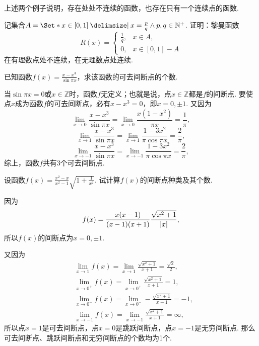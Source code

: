 上述两个例子说明，存在处处不连续的函数，也存在只有一个连续点的函数.

\begin{example}
记集合\(A = \Set*{ x\in[0,1] \given x = \frac{p}{q} \land p,q\in\mathbb{N}^+ }\).
证明：黎曼函数\[
R(x) = \left\{ \begin{array}{cl}
\frac{1}{q}, & x \in A, \\
0, & x \in [0,1] - A
\end{array} \right.
\]在有理数点处不连续，在无理数点处连续.
\end{example}

\begin{example}
已知函数\(f(x) = \frac{x-x^3}{\sin \pi x}\)，求该函数的可去间断点的个数.
\begin{solution}
当\(\sin \pi x = 0\)或\(x \in \mathbb{Z}\)时，函数\(f\)无定义；也就是说，点\(x\in\mathbb{Z}\)都是\(f\)的间断点.
要使点\(x\)成为函数\(f\)的可去间断点，必有\(x-x^3=0\)，即\(x=0,\pm1\).
\def\l#1{\lim\limits_{x\to#1}}%
又因为\[
\l{0} \frac{x-x^3}{\sin \pi x}
= \l{0} \frac{x(1-x^2)}{\pi x}
= \frac{1}{\pi},
\]\[
\l{1} \frac{x-x^3}{\sin \pi x}
= \l{1} \frac{1-3x^2}{\pi \cos \pi x}
= \frac{2}{\pi},
\]\[
\l{-1} \frac{x-x^3}{\sin \pi x}
= \l{-1} \frac{1-3x^2}{\pi \cos \pi x}
= \frac{2}{\pi},
\]综上，函数\(f\)共有3个可去间断点.
\end{solution}
\end{example}

\begin{example}
设函数\(f(x) = \frac{x^2-x}{x^2-1}\sqrt{1+\frac{1}{x^2}}\).
试计算\(f(x)\)的间断点种类及其个数.
\begin{solution}
因为\[
f(x) = \frac{x(x-1)}{(x-1)(x+1)} \frac{\sqrt{x^2+1}}{\abs{x}},
\]所以\(f(x)\)的间断点为\(x=0,\pm1\).

又因为\begin{align*}
&\lim\limits_{x\to1} f(x)
= \lim\limits_{x\to1} \frac{\sqrt{x^2+1}}{x+1}
= \frac{\sqrt{2}}{2}, \\
&\lim\limits_{x\to0^+} f(x)
= \lim\limits_{x\to0^+} \frac{\sqrt{x^2+1}}{x+1}
= 1, \\
&\lim\limits_{x\to0^-} f(x)
= \lim\limits_{x\to0^-} -\frac{\sqrt{x^2+1}}{x+1}
= -1, \\
&\lim\limits_{x\to-1} f(x)
= \lim\limits_{x\to-1} \frac{\sqrt{x^2+1}}{x+1}
= \infty,
\end{align*}
所以点\(x=1\)是可去间断点，点\(x=0\)是跳跃间断点，点\(x=-1\)是无穷间断点.
那么可去间断点、跳跃间断点和无穷间断点的个数均为1个.
\end{solution}
\end{example}

